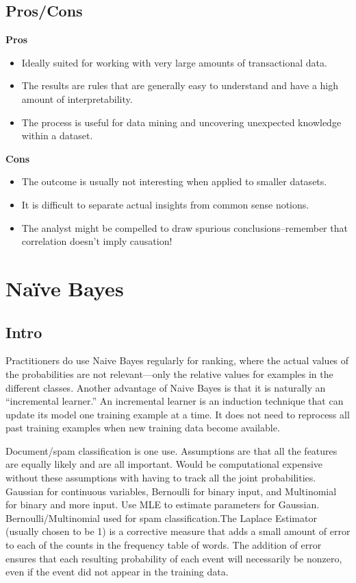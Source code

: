 \documentclass[]{book}
\begin{document}
\subsection{Pros/Cons}\label{proscons-12}

\textbf{Pros}

\begin{itemize}
\item
  Ideally suited for working with very large amounts of transactional
  data.
\item
  The results are rules that are generally easy to understand and have a
  high amount of interpretability.
\item
  The process is useful for data mining and uncovering unexpected
  knowledge within a dataset.
\end{itemize}

\textbf{Cons}

\begin{itemize}
\item
  The outcome is usually not interesting when applied to smaller
  datasets.
\item
  It is difficult to separate actual insights from common sense notions.
\item
  The analyst might be compelled to draw spurious conclusions--remember
  that correlation doesn't imply causation!
\end{itemize}

\section{Naïve Bayes}\label{naive-bayes}

\subsection{Intro}\label{intro-13}

Practitioners do use Naive Bayes regularly for ranking, where the actual
values of the probabilities are not relevant---only the relative values
for examples in the different classes. Another advantage of Naive Bayes
is that it is naturally an ``incremental learner.'' An incremental
learner is an induction technique that can update its model one training
example at a time. It does not need to reprocess all past training
examples when new training data become available.

Document/spam classification is one use. Assumptions are that all the
features are equally likely and are all important. Would be
computational expensive without these assumptions with having to track
all the joint probabilities. Gaussian for continuous variables,
Bernoulli for binary input, and Multinomial for binary and more input.
Use MLE to estimate parameters for Gaussian. Bernoulli/Multinomial used
for spam classification.The Laplace Estimator (usually chosen to be 1)
is a corrective measure that adds a small amount of error to each of the
counts in the frequency table of words. The addition of error ensures
that each resulting probability of each event will necessarily be
nonzero, even if the event did not appear in the training data.
\end{document}
